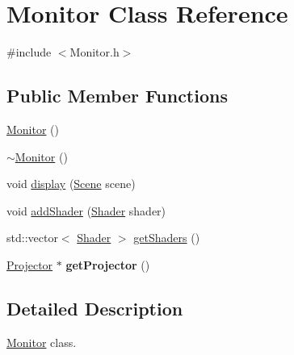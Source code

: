 \hypertarget{classMonitor}{
\section{Monitor Class Reference}
\label{classMonitor}
}


{\ttfamily \#include $<$Monitor.h$>$}

\subsection*{Public Member Functions}
\begin{DoxyCompactItemize}
\item 
\hyperlink{classMonitor_a639d27b16055d8681c2015d00ea083d8}{Monitor} ()
\item 
\hyperlink{classMonitor_a64aba8195effc068092ddea5a71e8176}{$\sim$Monitor} ()
\item 
void \hyperlink{classMonitor_adb084d156c6e01816a4158dfe71c142f}{display} (\hyperlink{classScene}{Scene} scene)
\item 
void \hyperlink{classMonitor_a21b504df5c53c279e94178de182af854}{addShader} (\hyperlink{classShader}{Shader} shader)
\item 
std::vector$<$ \hyperlink{classShader}{Shader} $>$ \hyperlink{classMonitor_ab0df82e6f794c5f9910f2ea9c879adb2}{getShaders} ()
\item 
\hypertarget{classMonitor_a0080eb7efa685555ec8ac8d5218f75a1}{
\hyperlink{classProjector}{Projector} $\ast$ {\bfseries getProjector} ()}
\label{classMonitor_a0080eb7efa685555ec8ac8d5218f75a1}

\end{DoxyCompactItemize}


\subsection{Detailed Description}
\hyperlink{classMonitor}{Monitor} class. 

